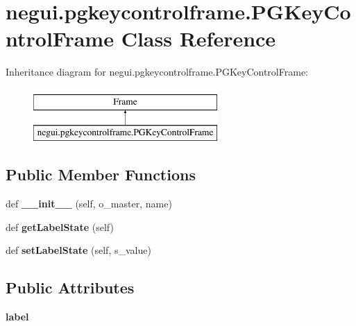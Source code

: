 \hypertarget{classnegui_1_1pgkeycontrolframe_1_1PGKeyControlFrame}{}\section{negui.\+pgkeycontrolframe.\+P\+G\+Key\+Control\+Frame Class Reference}
\label{classnegui_1_1pgkeycontrolframe_1_1PGKeyControlFrame}
Inheritance diagram for negui.\+pgkeycontrolframe.\+P\+G\+Key\+Control\+Frame\+:\begin{figure}[H]
\begin{center}
\leavevmode
\includegraphics[height=2.000000cm]{classnegui_1_1pgkeycontrolframe_1_1PGKeyControlFrame}
\end{center}
\end{figure}
\subsection*{Public Member Functions}
\begin{DoxyCompactItemize}
\item 
def {\bfseries \+\_\+\+\_\+init\+\_\+\+\_\+} (self, o\+\_\+master, name)\hypertarget{classnegui_1_1pgkeycontrolframe_1_1PGKeyControlFrame_a2848860a8cd5cd363a80e32024e37f72}{}\label{classnegui_1_1pgkeycontrolframe_1_1PGKeyControlFrame_a2848860a8cd5cd363a80e32024e37f72}

\item 
def {\bfseries get\+Label\+State} (self)\hypertarget{classnegui_1_1pgkeycontrolframe_1_1PGKeyControlFrame_a4d168f1ef026d6b6e84c91edd4652c4a}{}\label{classnegui_1_1pgkeycontrolframe_1_1PGKeyControlFrame_a4d168f1ef026d6b6e84c91edd4652c4a}

\item 
def {\bfseries set\+Label\+State} (self, s\+\_\+value)\hypertarget{classnegui_1_1pgkeycontrolframe_1_1PGKeyControlFrame_a374dd724048e9359606b36b3c69535e6}{}\label{classnegui_1_1pgkeycontrolframe_1_1PGKeyControlFrame_a374dd724048e9359606b36b3c69535e6}

\end{DoxyCompactItemize}
\subsection*{Public Attributes}
\begin{DoxyCompactItemize}
\item 
{\bfseries label}\hypertarget{classnegui_1_1pgkeycontrolframe_1_1PGKeyControlFrame_a269b180cb49a3ea307e2ee833880e488}{}\label{classnegui_1_1pgkeycontrolframe_1_1PGKeyControlFrame_a269b180cb49a3ea307e2ee833880e488}

\end{DoxyCompactItemize}


